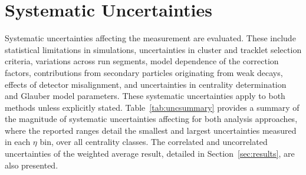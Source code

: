 \section{Systematic Uncertainties}
Systematic uncertainties affecting the \dndeta measurement are evaluated. These include statistical limitations in simulations, uncertainties in cluster and tracklet selection criteria, variations across run segments, model dependence of the correction factors, contributions from secondary particles originating from weak decays, effects of detector misalignment, and uncertainties in centrality determination and Glauber model parameters. These systematic uncertainties apply to both methods unless explicitly stated. Table~\ref{tab:uncsummary} provides a summary of the magnitude of systematic uncertainties affecting \dndeta for both analysis approaches, where the reported ranges detail the smallest and largest uncertainties measured in each $\eta$ bin, over all centrality classes. The correlated and uncorrelated uncertainties of the weighted average result, detailed in Section~\ref{sec:results}, are also presented.

